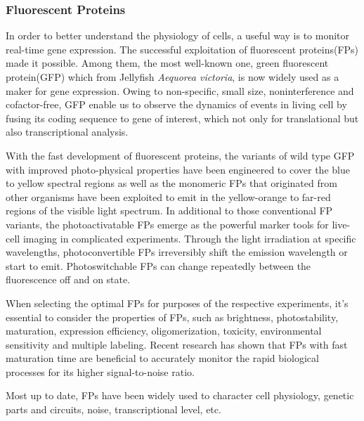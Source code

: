 \documentclass[fleqn,10pt]{wlscirep}
\begin{document}
\subsubsection[]{Fluorescent Proteins}

In order to better understand the physiology of cells, a useful way is to monitor real-time gene expression. The successful exploitation of fluorescent proteins(FPs) made it possible. Among them, the most well-known one, green fluorescent protein(GFP) which from Jellyfish \emph{Aequorea victoria}\cite{SHIMOMURA1962}, is now widely used as a maker for gene expression. Owing to non-specific, small size, noninterference and cofactor-free, GFP enable us to observe the dynamics of events in living cell by fusing its coding sequence to gene of interest\cite{Stearns1995}, which not only for translational but also transcriptional analysis.

With the fast development of fluorescent proteins, the variants of wild type GFP with improved photo-physical properties have been engineered to cover the blue to yellow spectral regions as well as the monomeric FPs that originated from other organisms have been exploited to emit in the yellow-orange to far-red regions of the visible light spectrum\cite{Day2009}. In additional to those conventional FP variants, the photoactivatable FPs emerge as the powerful marker tools for live-cell imaging in complicated experiments. Through the light irradiation at specific wavelengths, photoconvertible FPs irreversibly shift the emission wavelength or start to emit. Photoswitchable FPs can change repeatedly between the fluorescence off and on state\cite{Nienhaus2014}. 

When selecting the optimal FPs for purposes of the respective experiments, it’s essential to consider the properties of FPs, such as brightness, photostability, maturation, expression efficiency, oligomerization, toxicity, environmental sensitivity and multiple labeling\cite{Shaner2005}. Recent research has shown that FPs with fast maturation time are beneficial to accurately monitor the rapid biological processes for its higher signal-to-noise ratio\cite{Balleza2018}.

Most up to date, FPs have been widely used to character cell physiology, genetic parts and circuits, noise, transcriptional level, etc. 

\end{document}

